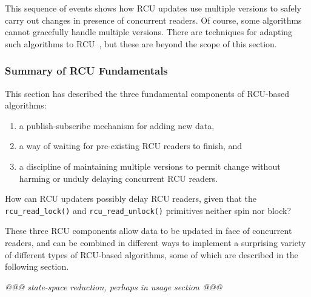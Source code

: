 This sequence of events shows how RCU updates use multiple versions
to safely carry out changes in presence of concurrent readers.
Of course, some algorithms cannot gracefully handle multiple versions.
There are techniques
for adapting such algorithms to RCU~\cite{PaulEdwardMcKenneyPhD},
but these are beyond the scope of this section.

\subsubsection{Summary of RCU Fundamentals}
\label{sec:defer:Summary of RCU Fundamentals}

This section has described the three fundamental components of RCU-based
algorithms:

\begin{enumerate}
\item	a publish-subscribe mechanism for adding new data,

\item	a way of waiting for pre-existing RCU readers to finish, and

\item	a discipline of maintaining multiple versions to permit
	change without harming or unduly delaying concurrent RCU readers.
\end{enumerate}

\QuickQuiz{}
	How can RCU updaters possibly delay RCU readers, given that the
	{\tt rcu\_read\_lock()} and {\tt rcu\_read\_unlock()}
	primitives neither spin nor block?
 \QuickQuizEnd

These three RCU components
allow data to be updated in face of concurrent readers, and
can be combined in different ways to
implement a surprising variety of different types of RCU-based algorithms,
some of which are described in the following section.

\emph{@@@ state-space reduction, perhaps in usage section @@@}
